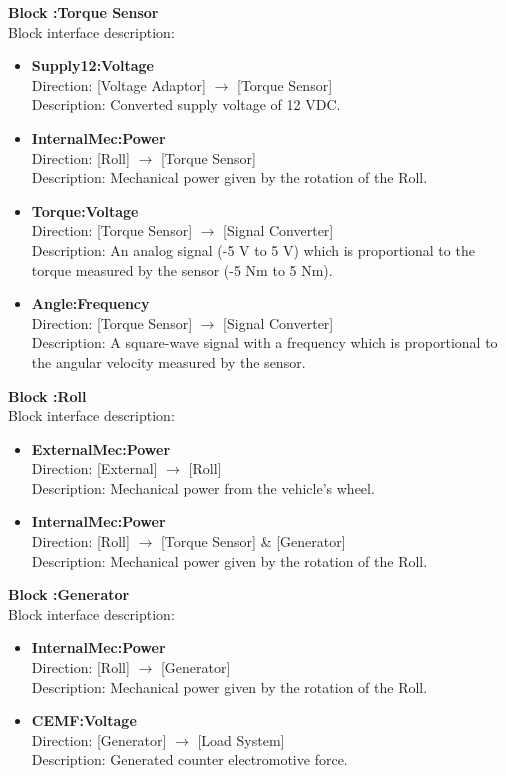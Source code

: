 \textbf{Block :Torque Sensor}\\
Block interface description:
\begin{itemize}
	\item \textbf{Supply12:Voltage}\\
	Direction: [Voltage Adaptor] $\rightarrow$ [Torque Sensor]\\
	Description: Converted supply voltage of 12 VDC.
	\item \textbf{InternalMec:Power}\\
	Direction: [Roll] $\rightarrow$ [Torque Sensor]\\
	Description: Mechanical power given by the rotation of the Roll.
	\item \textbf{Torque:Voltage}\\
	Direction: [Torque Sensor] $\rightarrow$ [Signal Converter]\\
	Description: An analog signal (-5 V to 5 V) which is proportional to the torque measured by the sensor (-5 Nm to 5 Nm).
	\item \textbf{Angle:Frequency}\\
	Direction: [Torque Sensor] $\rightarrow$ [Signal Converter]\\
	Description: A square-wave signal with a frequency which is proportional to the angular velocity measured by the sensor.
\end{itemize}
							
\textbf{Block :Roll}\\
Block interface description:
\begin{itemize}
	\item \textbf{ExternalMec:Power}\\
	Direction: [External] $\rightarrow$ [Roll]\\
	Description: Mechanical power from the vehicle's wheel.
	\item \textbf{InternalMec:Power}\\
	Direction: [Roll] $\rightarrow$ [Torque Sensor] \& [Generator]\\
	Description: Mechanical power given by the rotation of the Roll.
\end{itemize}
					
\textbf{Block :Generator}\\
Block interface description:
\begin{itemize}
	\item \textbf{InternalMec:Power}\\
	Direction: [Roll] $\rightarrow$ [Generator]\\
	Description: Mechanical power given by the rotation of the Roll.
	\item \textbf{CEMF:Voltage}\\
	Direction: [Generator] $\rightarrow$ [Load System]\\
	Description: Generated counter electromotive force.
\end{itemize}
			
